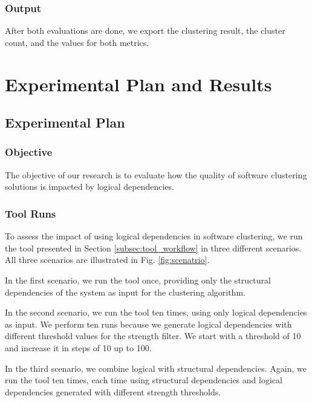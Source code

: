 \documentclass{ieeeaccess}
\begin{document}
\subsubsection{Output}

After both evaluations are done, we export the clustering result, the cluster count, and the values for both metrics.

\section{Experimental Plan and Results}
\label{sec:experiment}

\subsection{Experimental Plan}
\label{subsec:plan}

\subsubsection{Objective}
The objective of our research is to evaluate how the quality of software clustering solutions is impacted by logical dependencies.

\subsubsection{Tool Runs}
To assess the impact of using logical dependencies in software clustering, we run the tool presented in Section \ref{subsec:tool_workflow} in three different scenarios. All three scenarios are illustrated in Fig. \ref{fig:scenatrio}.

In the first scenario, we run the tool once, providing only the structural dependencies of the system as input for the clustering algorithm.

In the second scenario, we run the tool ten times, using only logical dependencies as input. We perform ten runs because we generate logical dependencies with different threshold values for the strength filter. We start with a threshold of 10 and increase it in steps of 10 up to 100.

In the third scenario, we combine logical with structural dependencies. Again, we run the tool ten times, each time using structural dependencies and logical dependencies generated with different strength thresholds.
\end{document}

